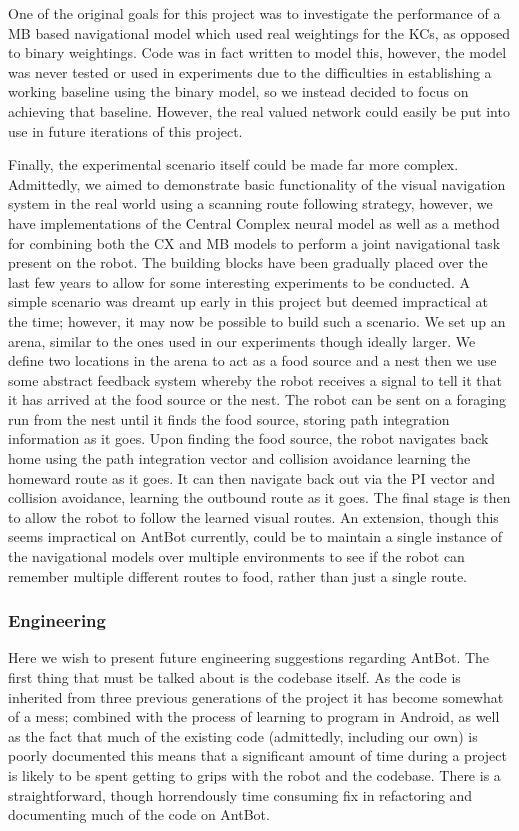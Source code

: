 \documentclass[a4paper,12pt]{article}
\begin{document}
One of the original goals for this project was to investigate the performance of a MB based navigational
model which used real weightings for the KCs, as opposed to binary weightings. Code was in fact written
to model this, however, the model was never tested or used in experiments due to the difficulties in
establishing a working baseline using the binary model, so we instead decided to focus on achieving that
baseline. However, the real valued network could easily be put into use in future iterations of this project.
\newline

Finally, the experimental scenario itself could be made far more complex. Admittedly, we aimed to demonstrate
basic functionality of the visual navigation system in the real world using a scanning route following strategy,
however, we have implementations of the Central Complex neural model as well as a method for combining
both the CX and MB models to perform a joint navigational task \cite{Zhang2017, Scimeca2017} present on the robot.
The building blocks have been gradually placed over the last few years to allow for some interesting experiments to
be conducted. A simple scenario was dreamt up early in this project but deemed impractical at the time; however,
it may now be possible to build such a scenario. We set up an arena, similar to the ones used in our experiments
though ideally larger. We define two locations in the arena to act as a food source and a nest then we use some
abstract feedback system whereby the robot receives a signal to tell it that it has arrived at the food source or
the nest. The robot can be sent on a foraging run from the nest until it finds the food source, storing path
integration information as it goes. Upon finding the food source, the robot navigates back home using
the path integration vector and collision avoidance learning the homeward route as it goes. It can then
navigate back out via the PI vector and collision avoidance, learning the outbound route as it goes. The final
stage is then to allow the robot to follow the learned visual routes. An extension, though this seems impractical
on AntBot currently, could be to maintain a single instance of the navigational models over multiple environments
to see if the robot can remember multiple different routes to food, rather than just a single route.
 
\subsubsection{Engineering} \label{sec:engineering}
Here we wish to present future engineering suggestions regarding AntBot. The first thing that must be talked
about is the codebase itself. As the code is inherited from three previous generations of the project it has
become somewhat of a mess; combined with the process of learning to program in Android, as well as the fact that
much of the existing code (admittedly, including our own) is poorly documented this means that a significant
amount of time during a project is likely to be spent getting to grips with the robot and the codebase. There
is a straightforward, though horrendously time consuming fix in refactoring and documenting much of the code on
AntBot. 
\newpage
\end{document}
